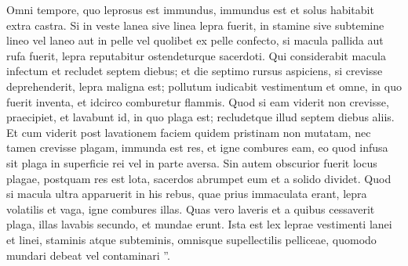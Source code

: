 \begin{biblechapter}
\begin{biblechapter}
\begin{biblechapter}
\begin{biblechapter}
\begin{biblechapter}
\begin{biblechapter}
\begin{biblechapter}
\begin{biblechapter}
\begin{biblechapter}
\begin{biblechapter}
\begin{biblechapter}
\begin{biblechapter}
\begin{biblechapter}
\verse Omni tempore, quo leprosus est immundus, immundus est et solus habitabit extra castra.
 \verse Si in veste lanea sive linea lepra fuerit, 
\verse in stamine sive subtemine lineo vel laneo aut in pelle vel quolibet ex pelle confecto, 
\verse si macula pallida aut rufa fuerit, lepra reputabitur ostendeturque sacerdoti. 
\verse Qui considerabit macula infectum et recludet septem diebus; 
\verse et die septimo rursus aspiciens, si crevisse deprehenderit, lepra maligna est; pollutum iudicabit vestimentum et omne, in quo fuerit inventa, 
\verse et idcirco comburetur flammis. 
\verse Quod si eam viderit non crevisse, 
\verse praecipiet, et lavabunt id, in quo plaga est; recludetque illud septem diebus aliis. 
\verse Et cum viderit post lavationem faciem quidem pristinam non mutatam, nec tamen crevisse plagam, immunda est res, et igne combures eam, eo quod infusa sit plaga in superficie rei vel in parte aversa. 
\verse Sin autem obscurior fuerit locus plagae, postquam res est lota, sacerdos abrumpet eum et a solido dividet. 
\verse Quod si macula ultra apparuerit in his rebus, quae prius immaculata erant, lepra volatilis et vaga, igne combures illas. 
\verse Quas vero laveris et a quibus cessaverit plaga, illas lavabis secundo, et mundae erunt.
 \verse Ista est lex leprae vestimenti lanei et linei, staminis atque subteminis, omnisque supellectilis pelliceae, quomodo mundari debeat vel contaminari ”.
 

\end{biblechapter}
\end{biblechapter}
\end{biblechapter}
\end{biblechapter}
\end{biblechapter}
\end{biblechapter}
\end{biblechapter}
\end{biblechapter}
\end{biblechapter}
\end{biblechapter}
\end{biblechapter}
\end{biblechapter}
\end{biblechapter}
